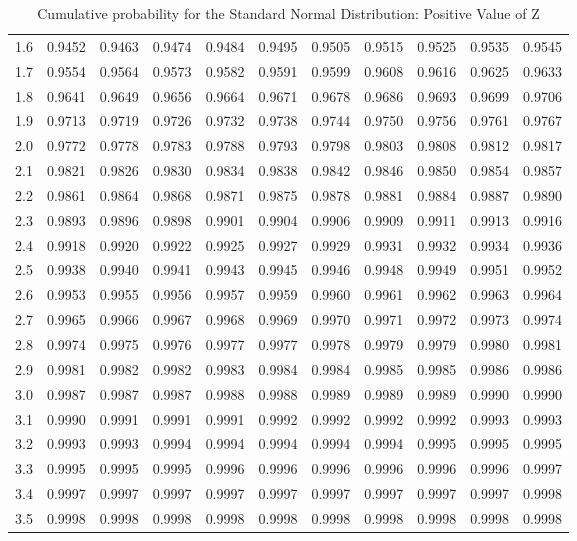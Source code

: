\begin{table}
{\begin{tabular}{|c|c|c|c|c|c|c|c|c|c|c|}
1.6 & 0.9452 &  0.9463 &  0.9474 &  0.9484 &  0.9495 &  0.9505 &  0.9515 &  0.9525 &  0.9535 &  0.9545 \\
1.7 & 0.9554 &  0.9564 &  0.9573 &  0.9582 &  0.9591 &  0.9599 &  0.9608 &  0.9616 &  0.9625 &  0.9633 \\
1.8 & 0.9641 &  0.9649 &  0.9656 &  0.9664 &  0.9671 &  0.9678 &  0.9686 &  0.9693 &  0.9699 &  0.9706 \\
1.9 & 0.9713 &  0.9719 &  0.9726 &  0.9732 &  0.9738 &  0.9744 &  0.9750 &  0.9756 &  0.9761 &  0.9767 \\
2.0 & 0.9772 &  0.9778 &  0.9783 &  0.9788 &  0.9793 &  0.9798 &  0.9803 &  0.9808 &  0.9812 &  0.9817 \\
2.1 & 0.9821 &  0.9826 &  0.9830 &  0.9834 &  0.9838 &  0.9842 &  0.9846 &  0.9850 &  0.9854 &  0.9857 \\
2.2 & 0.9861 &  0.9864 &  0.9868 &  0.9871 &  0.9875 &  0.9878 &  0.9881 &  0.9884 &  0.9887 &  0.9890 \\
2.3 & 0.9893 &  0.9896 &  0.9898 &  0.9901 &  0.9904 &  0.9906 &  0.9909 &  0.9911 &  0.9913 &  0.9916 \\
2.4 & 0.9918 &  0.9920 &  0.9922 &  0.9925 &  0.9927 &  0.9929 &  0.9931 &  0.9932 &  0.9934 &  0.9936 \\
2.5 & 0.9938 &  0.9940 &  0.9941 &  0.9943 &  0.9945 &  0.9946 &  0.9948 &  0.9949 &  0.9951 &  0.9952 \\
2.6 & 0.9953 &  0.9955 &  0.9956 &  0.9957 &  0.9959 &  0.9960 &  0.9961 &  0.9962 &  0.9963 &  0.9964 \\
2.7 & 0.9965 &  0.9966 &  0.9967 &  0.9968 &  0.9969 &  0.9970 &  0.9971 &  0.9972 &  0.9973 &  0.9974 \\
2.8 & 0.9974 &  0.9975 &  0.9976 &  0.9977 &  0.9977 &  0.9978 &  0.9979 &  0.9979 &  0.9980 &  0.9981 \\
2.9 & 0.9981 &  0.9982 &  0.9982 &  0.9983 &  0.9984 &  0.9984 &  0.9985 &  0.9985 &  0.9986 &  0.9986 \\
3.0 & 0.9987 &  0.9987 &  0.9987 &  0.9988 &  0.9988 &  0.9989 &  0.9989 &  0.9989 &  0.9990 &  0.9990 \\
3.1 & 0.9990 &  0.9991 &  0.9991 &  0.9991 &  0.9992 &  0.9992 &  0.9992 &  0.9992 &  0.9993 &  0.9993 \\
3.2 & 0.9993 &  0.9993 &  0.9994 &  0.9994 &  0.9994 &  0.9994 &  0.9994 &  0.9995 &  0.9995 &  0.9995 \\
3.3 & 0.9995 &  0.9995 &  0.9995 &  0.9996 &  0.9996 &  0.9996 &  0.9996 &  0.9996 &  0.9996 &  0.9997 \\
3.4 & 0.9997 &  0.9997 &  0.9997 &  0.9997 &  0.9997 &  0.9997 &  0.9997 &  0.9997 &  0.9997 &  0.9998 \\
3.5 & 0.9998 &  0.9998 &  0.9998 &  0.9998 &  0.9998 &  0.9998 &  0.9998 &  0.9998 &  0.9998 &  0.9998 \\
\hline	
\end{tabular}}
	\caption{Cumulative probability for the Standard Normal Distribution: Positive Value of Z}
	\label{tab:ztable}
\end{table}
